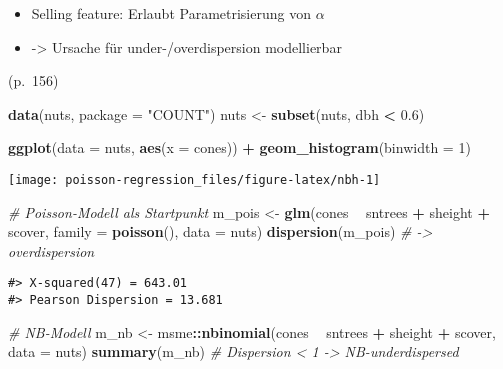 \documentclass[ngerman,a4paper,]{scrartcl}
\newenvironment{Shaded}{\begin{snugshade}}{\end{snugshade}}
\newcommand{\CommentTok}[1]{\textcolor[rgb]{0.56,0.35,0.01}{\textit{#1}}}
\newcommand{\DataTypeTok}[1]{\textcolor[rgb]{0.13,0.29,0.53}{#1}}
\newcommand{\DecValTok}[1]{\textcolor[rgb]{0.00,0.00,0.81}{#1}}
\newcommand{\FloatTok}[1]{\textcolor[rgb]{0.00,0.00,0.81}{#1}}
\newcommand{\KeywordTok}[1]{\textcolor[rgb]{0.13,0.29,0.53}{\textbf{#1}}}
\newcommand{\NormalTok}[1]{#1}
\newcommand{\OperatorTok}[1]{\textcolor[rgb]{0.81,0.36,0.00}{\textbf{#1}}}
\newcommand{\StringTok}[1]{\textcolor[rgb]{0.31,0.60,0.02}{#1}}
\providecommand{\tightlist}{%
  \setlength{\itemsep}{0pt}\setlength{\parskip}{0pt}}
\theoremstyle{definition}
\theoremstyle{definition}
\theoremstyle{definition}
\theoremstyle{remark}
\begin{document}
\begin{itemize}
\tightlist
\item
  Selling feature: Erlaubt Parametrisierung von \(\alpha\)
\item
  -\textgreater{} Ursache für under-/overdispersion modellierbar
\end{itemize}

\citet{hilbeModelingCountData2014} (p.~156)

\begin{Shaded}
\begin{Highlighting}[]
\KeywordTok{data}\NormalTok{(nuts, }\DataTypeTok{package =} \StringTok{"COUNT"}\NormalTok{)}
\NormalTok{nuts <-}\StringTok{ }\KeywordTok{subset}\NormalTok{(nuts, dbh }\OperatorTok{<}\StringTok{ }\FloatTok{0.6}\NormalTok{)}

\KeywordTok{ggplot}\NormalTok{(}\DataTypeTok{data =}\NormalTok{ nuts, }\KeywordTok{aes}\NormalTok{(}\DataTypeTok{x =}\NormalTok{ cones)) }\OperatorTok{+}
\StringTok{  }\KeywordTok{geom_histogram}\NormalTok{(}\DataTypeTok{binwidth =} \DecValTok{1}\NormalTok{)}
\end{Highlighting}
\end{Shaded}

\begin{center}\texttt{[image: poisson-regression\_files/figure-latex/nbh-1]} \end{center}

\begin{Shaded}
\begin{Highlighting}[]
\CommentTok{# Poisson-Modell als Startpunkt}
\NormalTok{m_pois <-}\StringTok{ }\KeywordTok{glm}\NormalTok{(cones }\OperatorTok{~}\StringTok{ }\NormalTok{sntrees }\OperatorTok{+}\StringTok{ }\NormalTok{sheight }\OperatorTok{+}\StringTok{ }\NormalTok{scover, }\DataTypeTok{family =} \KeywordTok{poisson}\NormalTok{(), }\DataTypeTok{data =}\NormalTok{ nuts) }
\KeywordTok{dispersion}\NormalTok{(m_pois) }\CommentTok{# -> overdispersion }
\end{Highlighting}
\end{Shaded}

\begin{verbatim}
#> X-squared(47) = 643.01
#> Pearson Dispersion = 13.681
\end{verbatim}

\begin{Shaded}
\begin{Highlighting}[]
\CommentTok{# NB-Modell}
\NormalTok{m_nb <-}\StringTok{ }\NormalTok{msme}\OperatorTok{::}\KeywordTok{nbinomial}\NormalTok{(cones }\OperatorTok{~}\StringTok{ }\NormalTok{sntrees }\OperatorTok{+}\StringTok{ }\NormalTok{sheight }\OperatorTok{+}\StringTok{ }\NormalTok{scover, }\DataTypeTok{data =}\NormalTok{ nuts)}
\KeywordTok{summary}\NormalTok{(m_nb) }\CommentTok{# Dispersion < 1 -> NB-underdispersed}
\end{Highlighting}
\end{Shaded}
\end{document}
